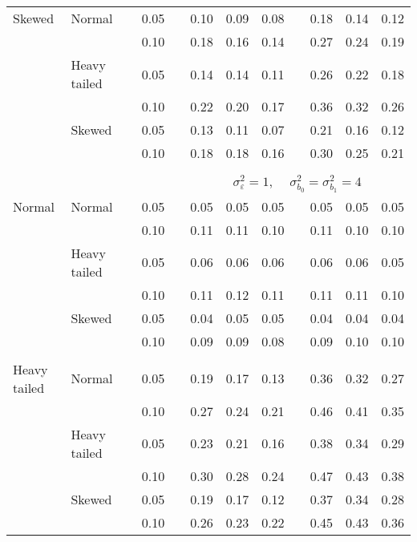 \begin{table}[ht]
\begin{scriptsize}
\begin{tabular}{ll p{.1cm} c p{.1cm} rrr p{.1cm} rrr}
Skewed       & Normal       && 0.05 &&  0.10 & 0.09 & 0.08 && 0.18 & 0.14 & 0.12 \\ 
             &              && 0.10 &&  0.18 & 0.16 & 0.14 && 0.27 & 0.24 & 0.19 \\ 
             & Heavy tailed && 0.05 &&  0.14 & 0.14 & 0.11 && 0.26 & 0.22 & 0.18 \\ 
             &              && 0.10 &&  0.22 & 0.20 & 0.17 && 0.36 & 0.32 & 0.26 \\ 
             & Skewed       && 0.05 &&  0.13 & 0.11 & 0.07 && 0.21 & 0.16 & 0.12 \\ 
             &              && 0.10 &&  0.18 & 0.18 & 0.16 && 0.30 & 0.25 & 0.21 \\ 


&&&&&&&&&&&\\
& && && \multicolumn{7}{c}{$\sigma_{\varepsilon}^2 = 1$, \ \ $\sigma_{b_0}^2 = \sigma_{b_1}^2 = 4$} \\ \cline{6-12}
\rowcolor{gray!20}Normal       & Normal       && 0.05 &&  0.05 & 0.05 & 0.05 && 0.05 & 0.05 & 0.05 \\ 
\rowcolor{gray!20}             &              && 0.10 &&  0.11 & 0.11 & 0.10 && 0.11 & 0.10 & 0.10 \\ 
\rowcolor{gray!20}             & Heavy tailed && 0.05 &&  0.06 & 0.06 & 0.06 && 0.06 & 0.06 & 0.05 \\ 
\rowcolor{gray!20}             &              && 0.10 &&  0.11 & 0.12 & 0.11 && 0.11 & 0.11 & 0.10 \\ 
\rowcolor{gray!20}             & Skewed       && 0.05 &&  0.04 & 0.05 & 0.05 && 0.04 & 0.04 & 0.04 \\ 
\rowcolor{gray!20}             &              && 0.10 &&  0.09 & 0.09 & 0.08 && 0.09 & 0.10 & 0.10 \\ 
             &&&&&&&&&&&\\
Heavy tailed & Normal       && 0.05 &&  0.19 & 0.17 & 0.13 && 0.36 & 0.32 & 0.27 \\ 
             &              && 0.10 &&  0.27 & 0.24 & 0.21 && 0.46 & 0.41 & 0.35 \\ 
             & Heavy tailed && 0.05 &&  0.23 & 0.21 & 0.16 && 0.38 & 0.34 & 0.29 \\ 
             &              && 0.10 &&  0.30 & 0.28 & 0.24 && 0.47 & 0.43 & 0.38 \\ 
             & Skewed       && 0.05 &&  0.19 & 0.17 & 0.12 && 0.37 & 0.34 & 0.28 \\ 
             &              && 0.10 &&  0.26 & 0.23 & 0.22 && 0.45 & 0.43 & 0.36 \\ 

\end{tabular}
\end{scriptsize}
\end{table}
